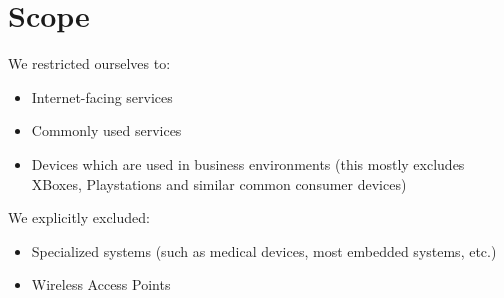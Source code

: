 \section{Scope}
\label{section:Scope}

We restricted ourselves to:
\begin{itemize}
\item Internet-facing services
\item Commonly used services
\item Devices which are used in business environments (this mostly excludes XBoxes, Playstations and similar common consumer devices)
\end{itemize}

We explicitly excluded:
\begin{itemize}
\item Specialized systems (such as medical devices, most embedded systems, etc.)
\item Wireless Access Points
\end{itemize}


